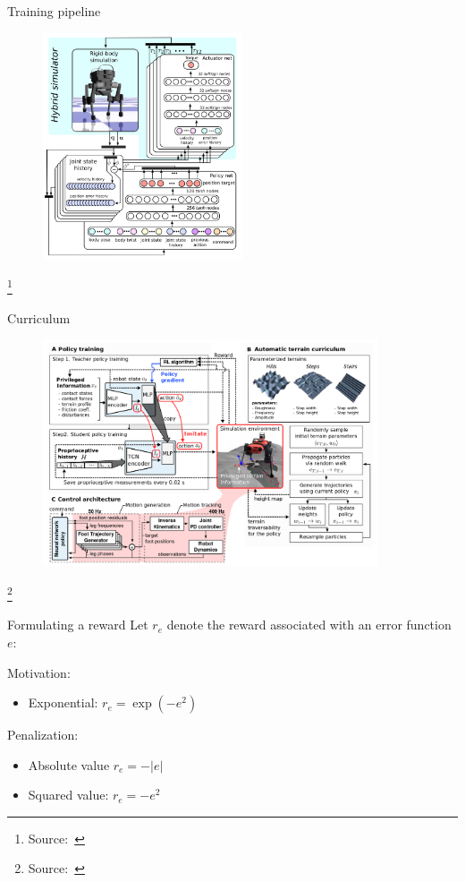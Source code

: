 \documentclass[11pt, aspectratio=169]{beamer}
\newcommand\blfootnote[1]{%
  \begingroup
  \renewcommand\thefootnote{}%
  \footnote{#1}%
  \addtocounter{footnote}{-1}%
  \endgroup
}
\begin{document}
\begin{frame}{Training pipeline}
    \begin{figure}
        \includegraphics[height=6.7cm]{figures/quadruped-training.png}
    \end{figure}
    \vspace{-0.7cm}
    \blfootnote{
        Source:~\cite{hwangbo2019}
    }
\end{frame}

\begin{frame}{Curriculum}
    \begin{figure}
        \includegraphics[height=6.7cm]{figures/quadruped-curriculum.png}
    \end{figure}
    \vspace{-0.7cm}
    \blfootnote{
        Source:~\cite{lee2020}
    }
\end{frame}

\begin{frame}{Formulating a reward}
    Let $r_e$ denote the reward associated with an error function $e$:

    Motivation:
    \begin{itemize}
        \item Exponential: $r_e = \exp(-e^2)$
    \end{itemize}

    Penalization:
    \begin{itemize}
        \item Absolute value $r_e = -|e|$
        \item Squared value: $r_e = -e^2$
    \end{itemize}
\end{frame}
\end{document}
